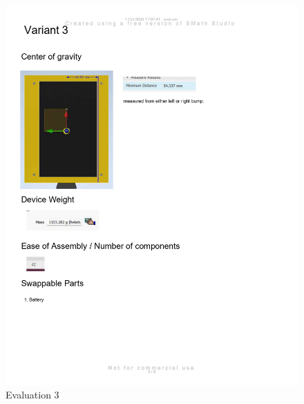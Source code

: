 \begin{figure}[H]
    \centering
    \includegraphics[width=\linewidth]{texs/appendix/data/evaluation/eval_page-0003.jpg}
    \caption{Evaluation 3}
    \label{fig:evaluation-3}
\end{figure}

